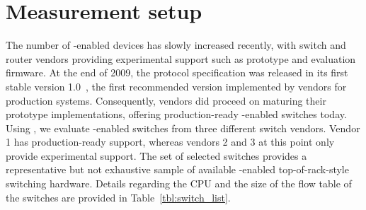 
\section{Measurement setup}\label{sec:oflops-switches}
%

The number of \of-enabled devices has slowly increased recently, with
switch and router vendors providing experimental \of support such
as prototype and evaluation firmware. At the end of 2009, the \of
protocol specification was released in its first stable version 1.0~\cite{openflow-spec}, 
the first recommended version implemented by vendors for production systems. 
Consequently, vendors did proceed on maturing their prototype implementations, 
offering production-ready \of-enabled switches today. Using \oflops, we 
evaluate \of-enabled switches from three different switch vendors.
Vendor 1 has production-ready \of support, whereas vendors 2 and
3 at this point only provide experimental \of support. 
The set of selected switches provides a representative but not
exhaustive sample of available \of-enabled top-of-rack-style
switching hardware. Details regarding the CPU and the size of the
flow table of the switches are provided in Table~\ref{tbl:switch_list}.

